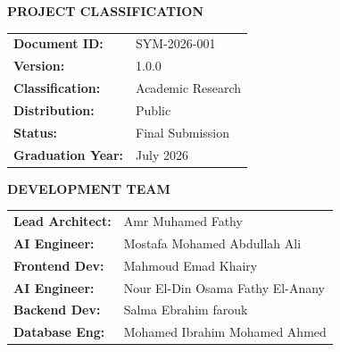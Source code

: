 

\thispagestyle{empty}
\vspace*{2cm}

\begin{center}
\begin{tcolorbox}[
    colback=brandPrimary!5,
    colframe=brandPrimary,
    boxrule=1pt,
    arc=3pt,
    width=0.8\textwidth,
    halign=center
]
\textbf{PROJECT CLASSIFICATION}\\[0.5em]
\begin{tabular}{@{}ll@{}}
\textbf{Document ID:} & SYM-2026-001 \\
\textbf{Version:} & 1.0.0 \\
\textbf{Classification:} & Academic Research \\
\textbf{Distribution:} & Public \\
\textbf{Status:} & Final Submission \\
\textbf{Graduation Year:} & July 2026 \\
\end{tabular}
\end{tcolorbox}

\vspace{1cm}

\begin{tcolorbox}[
    colback=brandSecondary!5,
    colframe=brandSecondary,
    boxrule=1pt,
    arc=3pt,
    width=0.8\textwidth,
    halign=center
]
\textbf{DEVELOPMENT TEAM}\\[0.5em]
\begin{tabular}{@{}ll@{}}
\textbf{Lead Architect:} & Amr Muhamed Fathy \\
\textbf{AI Engineer:} & Mostafa Mohamed Abdullah Ali \\
\textbf{Frontend Dev:} & Mahmoud Emad Khairy \\
\textbf{AI Engineer:} & Nour El-Din Osama Fathy El-Anany \\
\textbf{Backend Dev:} & Salma Ebrahim farouk \\
\textbf{Database Eng:} & Mohamed Ibrahim Mohamed Ahmed \\
\end{tabular}
\end{tcolorbox}


\end{center}
